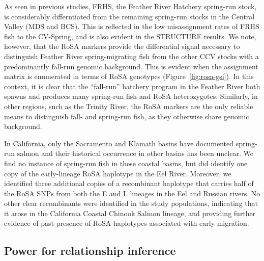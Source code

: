 As seen in previous studies, FRHS, the Feather River Hatchery
spring-run stock, is considerably differntiated from the remaining spring-run
stocks in the Central Valley (MDS and BCS). This is reflected in the low
misassignment rates of FRHS fish to the CV-Spring, and is also evident in the
STRUCTURE results.   We note, however, that the RoSA markers provide
the differential signal necessary to distinguish
Feather River spring-migrating fish from the other CCV stocks with a predominantly fall-run
genomic background. This is evident when the assignment matrix is enumerated in
terms of RoSA genotypes (Figure~\ref{fig:rosa-gsi}). In this context, it is clear that the ``fall-run'' hatchery
program in the Feather River both spawns and produces many spring-run fish and RoSA heterozygotes.
Similarly, in other regions, such as the Trinity River, the RoSA markers are the only reliable means to distinguish fall-
and spring-run fish, as they otherwise share genomic background.

In California, only the Sacramento and  Klamath basins have documented spring-run
salmon and their historical occurrence in other basins has been unclear. We find no
instance of spring-run fish in these coastal basins, but did identify one copy of the early-lineage
RoSA haplotype in the Eel River. Moreover, we identified three additional copies of a
recombinant haplotype that carries half of the RoSA SNPs from both the E and L lineages in the Eel and Russian rivers. No other clear recombinants were identified in the study populations, indicating that it arose in the California Coastal Chinook Salmon lineage, and providing further evidence of past presence of RoSA haplotypes associated with early migration.





\subsection*{Power for relationship inference}

